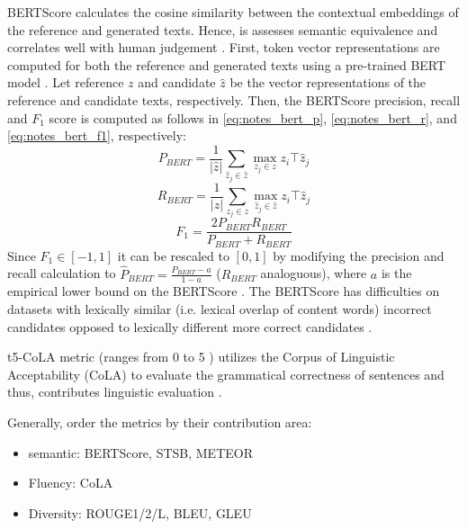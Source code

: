 BERTScore calculates the cosine similarity between the contextual embeddings of the reference and generated texts. 
Hence, is assesses semantic equivalence and correlates well with human judgement \cite{kurt_pehlivanoglu_comparative_2024}.
First, token vector representations are computed for both the reference and generated texts using a pre-trained BERT model \cite{hanna_fine_grained_2021}.
Let reference $z$ and candidate $\hat{z}$ be the vector representations of the reference and candidate texts, respectively.
Then, the BERTScore precision, recall and $F_1$ score is computed as follows in \autoref{eq:notes_bert_p}, \autoref{eq:notes_bert_r}, and \autoref{eq:notes_bert_f1}, respectively:
\begin{equation}
    P_{BERT} = \frac{1}{|\hat{z}|} \sum_{\hat{z}_j \in \hat{z}} \max_{z_j \in z} z_i\top \hat{z}_j
\label{eq:notes_bert_p}
\end{equation}
\begin{equation}
    R_{BERT} = \frac{1}{|z|} \sum_{z_j \in z} \max_{\hat{z}_j \in \hat{z}} z_i\top \hat{z}_j
\label{eq:notes_bert_r}
\end{equation}
\begin{equation}
    F_1 = \frac{2 P_{BERT} R_{BERT}}{P_{BERT} + R_{BERT}} 
\label{eq:notes_bert_f1}
\end{equation}
Since $F_1 \in \left[-1,1\right]$ it can be rescaled to $[0,1]$ by modifying the precision and recall calculation 
to $\hat{P}_{BERT} = \frac{P_{BERT} - a}{1 - a}$ ($R_{BERT}$ analoguous), where $a$ is the empirical lower bound on the BERTScore \cite{hanna_fine_grained_2021}.
The BERTScore has difficulties on datasets with lexically similar (i.e. lexical overlap of content words) incorrect candidates 
opposed to lexically different more correct candidates \cite{hanna_fine_grained_2021}.


\ac{t5}-CoLA metric (ranges from 0 to 5 \cite{kurt_pehlivanoglu_comparative_2024}) utilizes the Corpus of Linguistic Acceptability (CoLA) to evaluate the grammatical correctness of sentences and thus, 
contributes linguistic evaluation \cite{kurt_pehlivanoglu_comparative_2024}.

Generally, \citet{kurt_pehlivanoglu_comparative_2024} order the metrics by their contribution area:
\begin{itemize}
    \item semantic: BERTScore, STSB, METEOR
    \item Fluency: CoLA
    \item Diversity: ROUGE1/2/L, BLEU, GLEU
\end{itemize}

